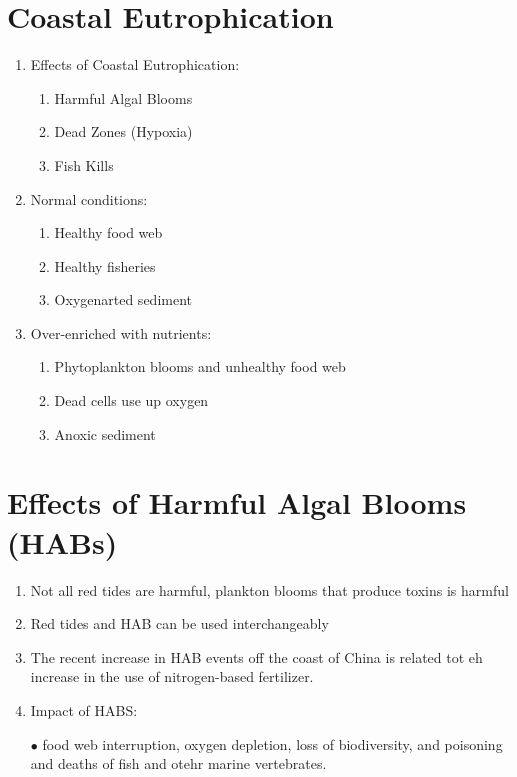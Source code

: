 \documentclass{report}
\begin{document}
\section{Coastal Eutrophication}
\begin{enumerate}
    \item Effects of Coastal Eutrophication:
    \begin{enumerate}
        \item Harmful Algal Blooms 
        \item Dead Zones (Hypoxia)
        \item Fish Kills 
    \end{enumerate}
    \item Normal conditions:
    \begin{enumerate}
        \item Healthy food web 
        \item Healthy fisheries 
        \item Oxygenarted sediment 
    \end{enumerate}
    \item Over-enriched with nutrients:
    \begin{enumerate}
        \item Phytoplankton blooms and unhealthy food web 
        \item Dead cells use up oxygen 
        \item Anoxic sediment 
    \end{enumerate}
\end{enumerate}


\section{Effects of Harmful Algal Blooms (HABs)}
\begin{enumerate}
    \item Not all red tides are harmful, plankton blooms that produce toxins is harmful 
    \item Red tides and HAB can be used interchangeably
    \item The recent increase in HAB events off the coast of China is related tot eh increase in the use of nitrogen-based fertilizer.
    \item Impact of HABS:
    \item [$\bullet$] food web interruption, oxygen depletion, loss of biodiversity, and poisoning and deaths of fish and otehr marine vertebrates.
\end{enumerate}
\end{document}
